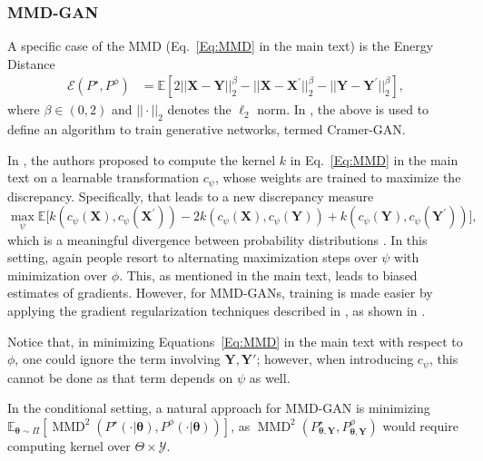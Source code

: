 \documentclass[twoside,11pt]{article}
\newcommand{\E}{\mathbb{E}}
\newcommand{\Y}{\mathcal{Y}}
\newcommand{\ddtheta}{\boldsymbol{\theta}}
\newcommand{\Ddsim}{\mathbf{X}}
\newcommand{\Ddobs}{\mathbf{Y}}
\begin{document}
	
	
	
	\subsubsection{MMD-GAN}		\label{app:MMDGAN}
	
	
	
	A specific case of the MMD (Eq.~\ref{Eq:MMD}  in the main text) is the Energy Distance
	\begin{equation}\label{Eq:energy_d}
	\begin{aligned}
	\mathcal{E} \left({P}^{\star}, {P}^{\phi}\right) &= \E\left[ 2 ||\Ddsim- \Ddobs||_2^\beta - ||\Ddsim-  \Ddsim^{\prime}||_2^\beta-||\Ddobs - \Ddobs^{\prime}||_2^\beta\right],
	\end{aligned}
	\end{equation}
	where $ \beta \in (0,2) $ and $ ||\cdot||_2 $ denotes the $ \ell_2 $ norm. In \cite{bellemare2017cramer}, the above is used to define an algorithm to train generative networks, termed Cramer-GAN.
	
	In \cite{li2017mmd}, the authors proposed to compute the kernel $ k $ in Eq.~\eqref{Eq:MMD}  in the main text on a learnable transformation $ c_\psi $, whose weights are trained to maximize the discrepancy. Specifically, that leads to a new discrepancy measure
	\begin{equation}\label{}
	\max_\psi \E\big[k\left(c_\psi(\Ddsim), c_\psi(\Ddsim^{\prime})\right)-2 k(c_\psi(\Ddsim), c_\psi(\Ddobs))
	+k\left(c_\psi(\Ddobs), c_\psi(\Ddobs^{\prime})\right)\big],
	\end{equation} 
	which is a meaningful divergence between probability distributions \citep{li2017mmd}. 
	In this setting, again people resort to alternating maximization steps over $ \psi $ with minimization over $ \phi $. This, as mentioned in the main text, leads to biased estimates of gradients. However, for MMD-GANs, training is made easier by applying the gradient regularization techniques described in \cite{gulrajani2017improved}, as shown in \cite{binkowski2018demystifying}.
	
	
	Notice that, in minimizing Equations~\eqref{Eq:MMD} in the main text with respect to $ \phi $, one could ignore the term involving $ \Ddobs, \Ddobs' $; however, when introducing $ c_\psi $, this cannot be done as that term depends on $ \psi  $ as well.
	
	In the conditional setting, a natural approach for MMD-GAN is minimizing \\$\E_{ \ddtheta \sim \Pi} [\operatorname{MMD}^2 \left({P}^{\star}(\cdot|\ddtheta ), {P}^{\phi}(\cdot|\ddtheta ) \right) ] $, as $ \operatorname{MMD}^2(P_{\ddtheta, \Ddobs}^\star, P_{\ddtheta, \Ddobs}^\phi) $ would require computing kernel over $ \Theta\times \Y $. 
	
\end{document}
